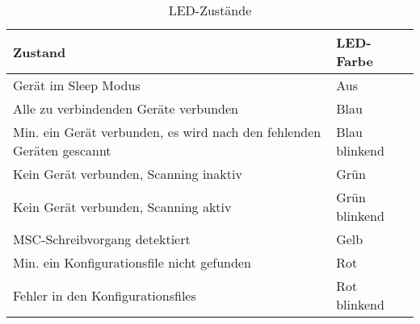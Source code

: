 \begin{table}[H]
	\centering
	\begin{tabular}[H]{l|l}
		Zustand & LED-Farbe \\
		\hline
		Gerät im Sleep Modus & Aus \\
		\hline
		Alle zu verbindenden Geräte verbunden & Blau \\
		\hline
		Min. ein Gerät verbunden, es wird nach den fehlenden Geräten gescannt & Blau blinkend \\
		\hline
		Kein Gerät verbunden, Scanning inaktiv & Grün \\
		\hline
		Kein Gerät verbunden, Scanning aktiv & Grün blinkend \\
		\hline
		\ac{MSC}-Schreibvorgang detektiert & Gelb \\
		\hline
		Min. ein Konfigurationsfile nicht gefunden & Rot \\
		\hline
		Fehler in den Konfigurationsfiles & Rot blinkend \\
	\end{tabular}
	\caption{LED-Zustände}
\end{table}